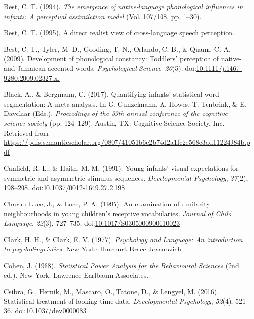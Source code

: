 \documentclass[man]{apa6}
\theoremstyle{definition}
\theoremstyle{definition}
\theoremstyle{definition}
\theoremstyle{remark}
\begin{document}
\hypertarget{ref-Best1994}{}
Best, C. T. (1994). \emph{The emergence of native-language phonological
influences in infants: A perceptual assimilation model} (Vol. 107/108,
pp. 1--30).

\hypertarget{ref-Best1995}{}
Best, C. T. (1995). A direct realist view of cross-language speech
perception.

\hypertarget{ref-Best2009}{}
Best, C. T., Tyler, M. D., Gooding, T. N., Orlando, C. B., \& Quann, C.
A. (2009). Development of phonological constancy: Toddlers' perception
of native- and Jamaican-accented words. \emph{Psychological Science},
\emph{20}(5).
doi:\href{https://doi.org/10.1111/j.1467-9280.2009.02327.x.}{10.1111/j.1467-9280.2009.02327.x.}

\hypertarget{ref-Black2017}{}
Black, A., \& Bergmann, C. (2017). Quantifying infants' statistical word
segmentation: A meta-analysis. In G. Gunzelmann, A. Howes, T. Tenbrink,
\& E. Davelaar (Eds.), \emph{Proceedings of the 39th annual conference
of the cognitive science society} (pp. 124--129). Austin, TX: Cognitive
Science Society, Inc. Retrieved from
\url{https://pdfs.semanticscholar.org/0807/41051b6e2b74d2a1fc2e568c3dd11224984b.pdf}

\hypertarget{ref-Canfield1991}{}
Canfield, R. L., \& Haith, M. M. (1991). Young infants' visual
expectations for symmetric and asymmetric stimulus sequences.
\emph{Developmental Psychology}, \emph{27}(2), 198--208.
doi:\href{https://doi.org/10.1037/0012-1649.27.2.198}{10.1037/0012-1649.27.2.198}

\hypertarget{ref-CharlesLuce1995}{}
Charles-Luce, J., \& Luce, P. A. (1995). An examination of similarity
neighbourhoods in young children's receptive vocabularies. \emph{Journal
of Child Language}, \emph{22}(3), 727--735.
doi:\href{https://doi.org/10.1017/S0305000900010023}{10.1017/S0305000900010023}

\hypertarget{ref-clark1977}{}
Clark, H. H., \& Clark, E. V. (1977). \emph{Psychology and Language: An
introduction to psycholinguistics.} New York: Harcourt Brace Jovanovich.

\hypertarget{ref-cohen}{}
Cohen, J. (1988). \emph{Statistical Power Analysis for the Behavioural
Sciences} (2nd ed.). New York: Lawrence Earlbaum Associates.

\hypertarget{ref-Csibra2016}{}
Csibra, G., Hernik, M., Mascaro, O., Tatone, D., \& Lengyel, M. (2016).
Statistical treatment of looking-time data. \emph{Developmental
Psychology}, \emph{52}(4), 521--36.
doi:\href{https://doi.org/10.1037/dev0000083}{10.1037/dev0000083}
\end{document}
